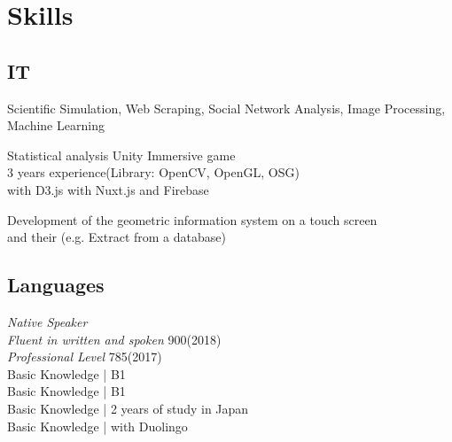 
\vspace{0.3cm}
\section{Skills}
\subsection{IT}
\textbullet{}  Scientific Simulation, Web Scraping, Social Network Analysis, Image Processing, Machine Learning

\textbullet{}  Statistical analysis
 \textbullet{}   Unity
\textbullet{}  Immersive game \\
\textbullet{}  3 years experience(Library: OpenCV, OpenGL, OSG) \\
\textbullet{}  with D3.js
\textbullet{}  with Nuxt.js and Firebase
\sectionsep

\textbullet{} \href{https://drive.google.com/open?id=0B6rPLgzEHZsROHV4eUJxNUF6YWc}{} Development of the geometric information system on a touch screen\\ 
\textbullet{}  and their (e.g. Extract from a database) \\

\sectionsep

\subsection{Languages}

\textbullet{}  \emph{Native Speaker} \\
\textbullet{}  \emph{Fluent in written and spoken} \href{https://www.etsglobal.org/}{}900(2018) \\
\textbullet{}  \emph{Professional Level} 785(2017) \\
\textbullet{}  Basic Knowledge | B1 \\
\textbullet{}  Basic Knowledge | B1 \\
\textbullet{}  Basic Knowledge | 2 years of study in Japan \\
\textbullet{}  Basic Knowledge | with Duolingo \\
    
\sectionsep



\sectionsep